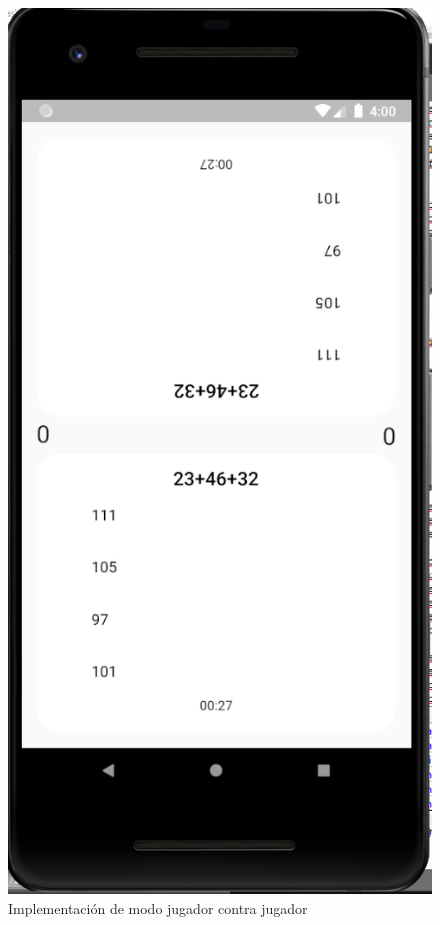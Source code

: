 \documentclass{article}
\begin{document}
\begin{figure}[H]
    \centering
    \includegraphics[scale=0.8]{imgs/Imp/Pvp}
    \caption{Implementación de modo jugador contra jugador}
\end{figure}
\end{document}
